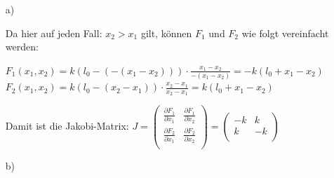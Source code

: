 \documentclass[DIV12]{scrartcl}
\begin{document}
\begin{itemize}
    \item[a)]

        Da hier auf jeden Fall: \(x_2>x_1\) gilt, k{\" o}nnen \(F_1\) und \(F_2\) wie folgt vereinfacht werden:

        \(F_1\left(x_1, x_2\right)=k\left(l_0-\left(-\left(x_1-x_2\right)\right)\right)\cdot\frac{x_1-x_2}{-\left(x_1-x_2\right)}=-k\left(l_0+x_1-x_2\right)\)\\
        \(F_2\left(x_1, x_2\right)=k\left(l_0-\left(x_2-x_1\right)\right)\cdot\frac{x_2-x_1}{x_2-x_1}=k\left(l_0+x_1-x_2\right)\)

        Damit ist die Jakobi-Matrix:
        \(J=\left(
        \begin{array}{cc}
         \frac{\partial F_1}{\partial x_1} & \frac{\partial F_1}{\partial x_2} \\
         \frac{\partial F_2}{\partial x_1} & \frac{\partial F_2}{\partial x_2} \\
        \end{array}
        \right)=\left(
        \begin{array}{cc}
         -k & k \\
         k & -k \\
        \end{array}
        \right)\)

    \item[b)]


\end{itemize}
\end{document}
